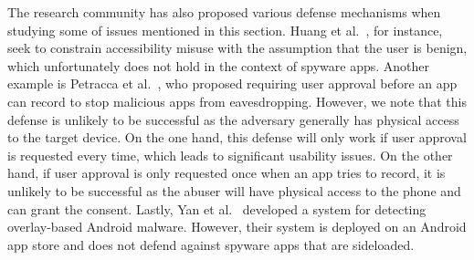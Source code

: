 The research community has also proposed various defense mechanisms when
studying some of issues mentioned in this section. Huang et
al.~\cite{huang2021a11y}, for instance, seek to constrain accessibility misuse
with the assumption that the user is benign, which unfortunately does not hold
in the context of spyware apps.
Another example is Petracca et
al.~\cite{petracca2015audroid}, who proposed requiring user approval before an
app can record to stop malicious apps from eavesdropping. However, we note that
this defense is unlikely to be successful as the adversary generally has physical access to the target device. On the one
hand, this defense will only work if user approval is requested every time,
which leads to significant usability issues. On the other hand, if user approval is
only requested once when an app tries to record, it is unlikely to be successful
as the abuser will have physical access to the phone and can grant the consent. Lastly, Yan et al.~\cite{yan2019understanding} developed a system for detecting overlay-based Android malware. However, their system is deployed on an Android app store and does not defend against spyware apps that are sideloaded.





